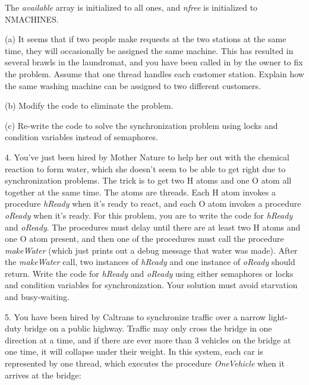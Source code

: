 \begin{description}
The {\em available} array is initialized to all ones, and {\em nfree} is
initialized to NMACHINES.

\begin{description}

\item{(a)} It seems that
if two people make requests at the two stations at the same time, they
will occasionally be assigned the same machine.  This has resulted in
several brawls in the laundromat, and you have been called in by the
owner to fix the problem.  Assume that one thread handles each
customer station.  Explain how the same washing machine can be assigned
to two different customers.

\item{(b)} Modify the code to eliminate the problem.

\item{(c)} Re-write the code to solve the synchronization problem 
using locks and condition variables instead of semaphores.

\end{description}

\item{4.} You've just been hired by Mother Nature to help her out with the
chemical reaction to form water, which she doesn't seem to be
able to get right due to synchronization problems.  The trick is to
get two H atoms and one O atom all together at the same time.  The
atoms are threads.  Each H atom invokes a procedure {\em hReady} when it's
ready to react, and each O atom invokes a procedure {\em oReady}
when it's ready.  For this problem, you are to write the code for
{\em hReady} and {\em oReady}.  The procedures must delay until there
are at least two H atoms and one O atom present, and then one
of the procedures must call the procedure {\em makeWater} (which
just prints out a debug message that water was made).
After the {\em makeWater} call, two 
instances of {\em hReady} and one instance of {\em oReady} should return.
Write the code for {\em hReady} and {\em oReady} using
either semaphores or locks and condition variables for synchronization.
Your solution must avoid starvation and busy-waiting.

\item{5.} You have been hired by Caltrans to synchronize traffic over a
narrow light-duty bridge on a public highway.  Traffic may only cross
the bridge in one direction at a time, and if there are ever more than
3 vehicles on the bridge at one time, it will collapse  under their
weight.  In this system, each car is represented by one thread,
which executes the procedure {\em OneVehicle} when it arrives
at the bridge:


\end{description}

